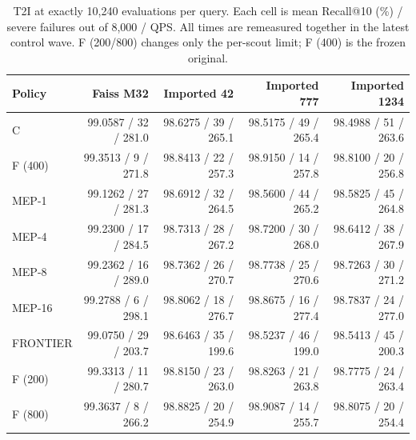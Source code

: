 \begin{table}[t]
\centering
\caption{T2I at exactly 10,240 evaluations per query. Each cell is mean Recall@10 (\%) / severe failures out of 8,000 / QPS. All times are remeasured together in the latest control wave. F (200/800) changes only the per-scout limit; F (400) is the frozen original.}
\label{tab:fixed}
\small
\begin{tabular}{@{}lrrrr@{}}
\toprule
Policy & Faiss M32 & Imported 42 & Imported 777 & Imported 1234 \\
\midrule
C & 99.0587 / 32 / 281.0 & 98.6275 / 39 / 265.1 & 98.5175 / 49 / 265.4 & 98.4988 / 51 / 263.6 \\
F (400) & 99.3513 / 9 / 271.8 & 98.8413 / 22 / 257.3 & 98.9150 / 14 / 257.8 & 98.8100 / 20 / 256.8 \\
MEP-1 & 99.1262 / 27 / 281.3 & 98.6912 / 32 / 264.5 & 98.5600 / 44 / 265.2 & 98.5825 / 45 / 264.8 \\
MEP-4 & 99.2300 / 17 / 284.5 & 98.7313 / 28 / 267.2 & 98.7200 / 30 / 268.0 & 98.6412 / 38 / 267.9 \\
MEP-8 & 99.2362 / 16 / 289.0 & 98.7362 / 26 / 270.7 & 98.7738 / 25 / 270.6 & 98.7263 / 30 / 271.2 \\
MEP-16 & 99.2788 / 6 / 298.1 & 98.8062 / 18 / 276.7 & 98.8675 / 16 / 277.4 & 98.7837 / 24 / 277.0 \\
FRONTIER & 99.0750 / 29 / 203.7 & 98.6463 / 35 / 199.6 & 98.5237 / 46 / 199.0 & 98.5413 / 45 / 200.3 \\
F (200) & 99.3313 / 11 / 280.7 & 98.8150 / 23 / 263.0 & 98.8263 / 21 / 263.8 & 98.7775 / 24 / 263.4 \\
F (800) & 99.3637 / 8 / 266.2 & 98.8825 / 20 / 254.9 & 98.9087 / 14 / 255.7 & 98.8075 / 20 / 254.4 \\
\bottomrule
\end{tabular}
\end{table}
